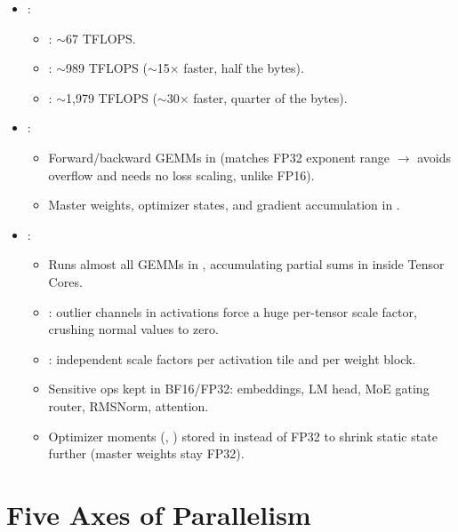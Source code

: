 \begin{itemize}
    \item {}:
    \begin{itemize}
        \item {}: $\sim$67 TFLOPS.
        \item {}: $\sim$989 TFLOPS ($\sim$15$\times$ faster, half the bytes).
        \item {}: $\sim$1,979 TFLOPS ($\sim$30$\times$ faster, quarter of the bytes).
    \end{itemize}
    \item {}:
    \begin{itemize}
        \item Forward/backward GEMMs in  (matches FP32 exponent range $\rightarrow$ avoids overflow and needs no loss scaling, unlike FP16).
        \item Master weights, optimizer states, and gradient accumulation in .
    \end{itemize}
    \item {}:
    \begin{itemize}
        \item Runs almost all GEMMs in , accumulating partial sums in  inside Tensor Cores.
        \item {}: outlier channels in activations force a huge per-tensor scale factor, crushing normal values to zero.
        \item {}: independent scale factors per  activation tile and per  weight block.
        \item Sensitive ops kept in BF16/FP32: embeddings, LM head, MoE gating router, RMSNorm, attention.
        \item Optimizer moments (, ) stored in  instead of FP32 to shrink static state further (master weights stay FP32).
    \end{itemize}
\end{itemize}

\section{Five Axes of Parallelism}

